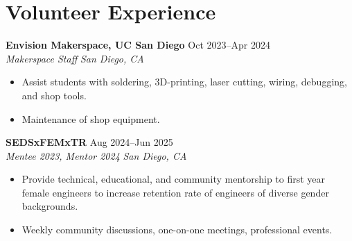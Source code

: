 \documentclass[11pt,a4paper]{article}
\newcommand{\resumeHeading}[4]{
  \vspace{0.15cm}
  \noindent\textbf{#1} \hfill #2 \\
  \noindent\textit{#3} \hfill \textit{#4} \par\vspace{0.1cm}
}
\begin{document}
\section{Volunteer Experience}

\resumeHeading{Envision Makerspace, UC San Diego}{Oct 2023--Apr 2024}{Makerspace Staff}{San Diego, CA}
\begin{itemize}[leftmargin=0.2in, itemsep=2pt, parsep=0pt, topsep=2pt]
    \item Assist students with soldering, 3D-printing, laser cutting, wiring, debugging, and shop tools.
    \item Maintenance of shop equipment.
\end{itemize}

\resumeHeading{SEDSxFEMxTR}{Aug 2024--Jun 2025}{Mentee 2023, Mentor 2024}{San Diego, CA}
\begin{itemize}[leftmargin=0.2in, itemsep=2pt, parsep=0pt, topsep=2pt]
    \item Provide technical, educational, and community mentorship to first year female engineers to increase retention rate of engineers of diverse gender backgrounds.
    \item Weekly community discussions, one-on-one meetings, professional events.
\end{itemize}
\end{document}
